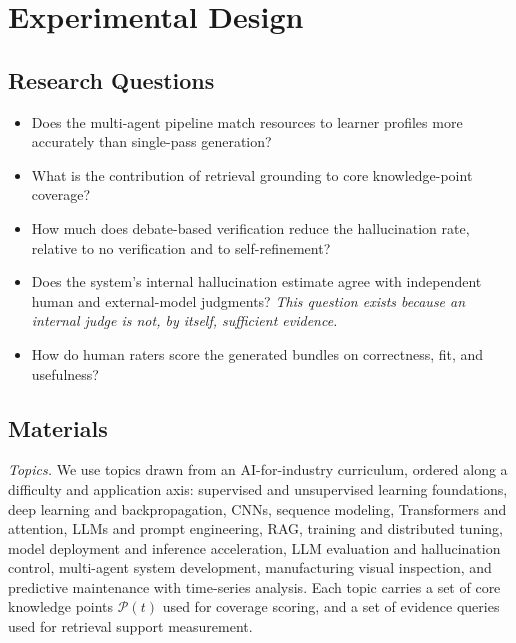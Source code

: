 \section{Experimental Design}
\label{sec:exp}

\subsection{Research Questions}

\begin{itemize}
\item[\textbf{RQ1 (adaptation).}] Does the multi-agent pipeline match
resources to learner profiles more accurately than single-pass generation?
\item[\textbf{RQ2 (coverage).}] What is the contribution of retrieval
grounding to core knowledge-point coverage?
\item[\textbf{RQ3 (reliability).}] How much does debate-based verification
reduce the hallucination rate, relative to no verification and to
self-refinement?
\item[\textbf{RQ4 (verification validity).}] Does the system's internal
hallucination estimate agree with independent human and external-model
judgments? \emph{This question exists because an internal judge is not, by
itself, sufficient evidence.}
\item[\textbf{RQ5 (perceived quality).}] How do human raters score the
generated bundles on correctness, fit, and usefulness?
\end{itemize}

\subsection{Materials}
\label{ssec:materials}

\emph{Topics.} We use  topics drawn from an AI-for-industry
curriculum, ordered along a difficulty and application axis: supervised and
unsupervised learning foundations, deep learning and backpropagation, CNNs,
sequence modeling, Transformers and attention, LLMs and prompt engineering,
RAG, training and distributed tuning, model deployment and inference
acceleration, LLM evaluation and hallucination control, multi-agent system
development, manufacturing visual inspection, and predictive maintenance with
time-series analysis. Each topic carries a set of core knowledge points
$\mathcal{P}(t)$ used for coverage scoring, and a set of evidence queries used
for retrieval support measurement.

